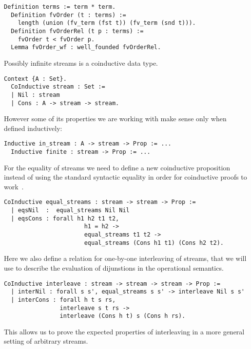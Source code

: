 \begin{lstlisting}[language=Coq]
  Definition terms := term * term.
  Definition fvOrder (t : terms) :=
    length (union (fv_term (fst t)) (fv_term (snd t))).
  Definition fvOrderRel (t p : terms) :=
    fvOrder t < fvOrder p.
  Lemma fvOrder_wf : well_founded fvOrderRel.
\end{lstlisting}

Possibly infinite streams is a coinductive data type.

\begin{lstlisting}[language=Coq]
  Context {A : Set}.
  CoInductive stream : Set :=
  | Nil : stream
  | Cons : A -> stream -> stream.
\end{lstlisting}

However some of its properties we are working with make sense only when defined inductively:

\begin{lstlisting}[language=Coq]
  Inductive in_stream : A -> stream -> Prop := ...
  Inductive finite : stream -> Prop := ...
\end{lstlisting}

For the equality of streams we need to define a new coinductive proposition instead of using the standard syntactic equality in order for coinductive proofs to work~\cite{CPDT}.

\begin{lstlisting}[language=Coq]
  CoInductive equal_streams : stream -> stream -> Prop :=
  | eqsNil  :  equal_streams Nil Nil
  | eqsCons : forall h1 h2 t1 t2,
                       h1 = h2 ->
                       equal_streams t1 t2 ->
                       equal_streams (Cons h1 t1) (Cons h2 t2).
\end{lstlisting}

Here we also define a relation for one-by-one interleaving of streams, that we will use to describe the evaluation of dijunstions in the operational semantics.

\begin{lstlisting}[language=Coq]
  CoInductive interleave : stream -> stream -> stream -> Prop :=
  | interNil : forall s s', equal_streams s s' -> interleave Nil s s'
  | interCons : forall h t s rs,
                interleave s t rs ->
                interleave (Cons h t) s (Cons h rs).
\end{lstlisting}

This allows us to prove the expected properties of interleaving in a more general setting of arbitrary streams.

